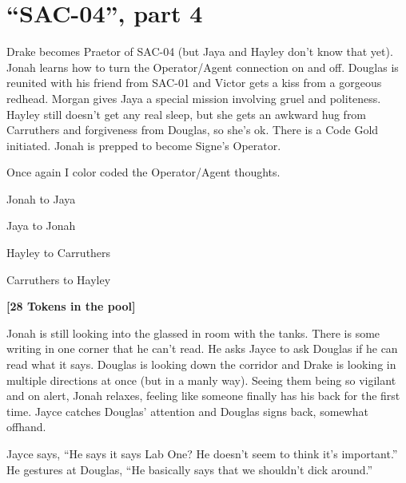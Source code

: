\setcounter{chapter}{ 35 }
\chapter{\textbf{``SAC-04'', part 4} }






Drake becomes Praetor of SAC-04 (but Jaya and Hayley don't know that yet).  Jonah learns how to turn the Operator/Agent connection on and off.  Douglas is reunited with his friend from SAC-01 and Victor gets a kiss from a gorgeous redhead.  Morgan gives Jaya a special mission involving gruel and politeness.  Hayley still doesn't get any real sleep, but she gets an awkward hug from Carruthers and forgiveness from Douglas, so she's ok.  There is a Code Gold initiated. Jonah is prepped to become Signe's Operator.



Once again I color coded the Operator/Agent thoughts.

 {\color[RGB]{74,134,232}Jonah to Jaya} 

 {\color[RGB]{255,0,0}Jaya to Jonah} 

 {\color[RGB]{230,145,56}Hayley to Carruthers} 

 {\color[RGB]{153,0,255}Carruthers to Hayley}  {\color[RGB]{153,0,255} } 



\noindent\hrulefill





\textbf{{[}28 Tokens in the pool{]}}



Jonah is still looking into the glassed in room with the tanks.  There is some writing in one corner that he can't read.  He asks Jayce to ask Douglas if he can read what it says.  Douglas is looking down the corridor and Drake is looking in multiple directions at once (but in a manly way).  Seeing them being so vigilant and on alert, Jonah relaxes, feeling like someone finally has his back for the first time. Jayce catches Douglas' attention and Douglas signs back, somewhat offhand.



Jayce says, ``He says it says Lab One?  He doesn't seem to think it's important.''  He gestures at Douglas, ``He basically says that we shouldn't dick around.''




